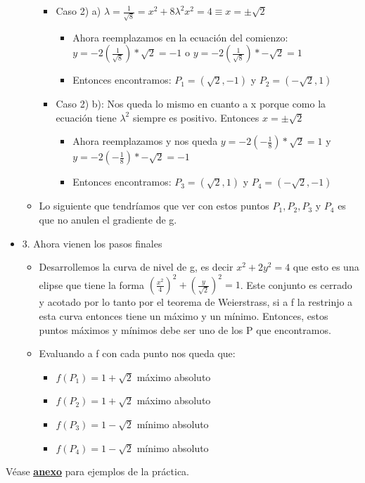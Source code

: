 \documentclass[10pt,a4paper]{article}
\begin{document}
\begin{itemize}
\begin{itemize}
            \begin{itemize}
                \item Caso 2) a) $\lambda = \frac{1}{\sqrt{8}} = x^{2} + 8\lambda^{2}x^{2} = 4 \equiv x = \pm \sqrt{2}$
                \begin{itemize}
                    \item Ahora reemplazamos en la ecuación del comienzo: $ y = -2(\frac{1}{\sqrt{8}}) * \sqrt{2} = -1 $ o $y = -2(\frac{1}{\sqrt{8}}) * -\sqrt{2} = 1$
                    \item Entonces encontramos: $P_{1} = (\sqrt{2}, -1)$ y $P_{2} = (-\sqrt{2}, 1)$
                \end{itemize}
                \item Caso 2) b): Nos queda lo mismo en cuanto a x porque como la ecuación tiene $\lambda^{2}$ siempre es positivo. Entonces $x = \pm \sqrt{2}$ 
                \begin{itemize}
                    \item Ahora reemplazamos y nos queda $y = -2(-\frac{1}{8}) * \sqrt{2} = 1$ y $y = -2(-\frac{1}{8}) * -\sqrt{2} = -1 $
                    \item Entonces encontramos: $P_{3} = (\sqrt{2}, 1)$ y $P_{4} = (-\sqrt{2}, -1)$
                \end{itemize}
            \end{itemize}
            \item Lo siguiente que tendríamos que ver con estos puntos $P_{1}, P_{2}, P_{3} $ y $P_{4}$ es que no anulen el gradiente de g.
        \end{itemize}
        \item 3. Ahora vienen los pasos finales
        \begin{itemize}
            \item Desarrollemos la curva de nivel de g, es decir $x^{2} + 2y^{2} = 4$ que esto es una elipse que tiene la forma $(\frac{x^{2}}{4})^{2} + (\frac{y}{\sqrt{2}})^{2} = 1$. Este conjunto es cerrado y acotado por lo tanto por el teorema de Weierstrass, si a f la restrinjo a esta curva entonces tiene un máximo y un mínimo. Entonces, estos puntos máximos y mínimos debe ser uno de los P que encontramos.
            \item Evaluando a f con cada punto nos queda que: 
            \begin{itemize}
                \item $f(P_{1}) = 1 + \sqrt{2}$ máximo absoluto
                \item $f(P_{2}) = 1 + \sqrt{2}$ máximo absoluto 
                \item $f(P_{3}) = 1 - \sqrt{2}$ mínimo absoluto
                \item $f(P_{4}) = 1 - \sqrt{2}$ mínimo absoluto
            \end{itemize}
        \end{itemize}
    \end{itemize}
Véase \hyperref[subsec:multiplicadores_lagrange]{\textbf{\underline{anexo}}} para ejemplos de la práctica.
\end{document}
